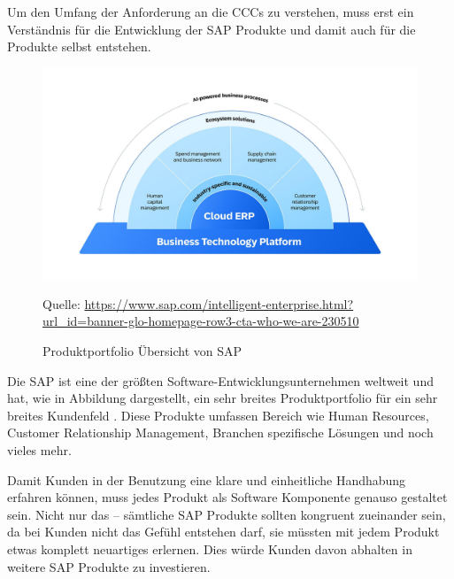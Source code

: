 \documentclass[../main.tex]{subfiles}
\begin{document}
Um den Umfang der Anforderung an die \glspl{CCC} zu verstehen, muss erst ein Verständnis für die Entwicklung der SAP Produkte und damit auch für die Produkte selbst entstehen.

\begin{figure}[ht]
    \centering
    \includegraphics[scale=.21]{"bilder/produktportfolio.jpg"}
    \caption{Produktportfolio Übersicht von SAP}
    \footnotesize Quelle: \url{https://www.sap.com/intelligent-enterprise.html?url_id=banner-glo-homepage-row3-cta-who-we-are-230510}
    \label{fig:produktportfolio}
\end{figure}

Die SAP ist eine der größten Software-Entwicklungsunternehmen weltweit und hat, wie in Abbildung  dargestellt, ein sehr breites Produktportfolio für ein sehr breites Kundenfeld  \cite{CorporateFactSheet}.
Diese Produkte umfassen Bereich wie Human Resources, Customer Relationship Management, Branchen spezifische Lösungen und noch vieles mehr.

Damit Kunden in der Benutzung eine klare und einheitliche Handhabung erfahren können, muss jedes Produkt als Software Komponente genauso gestaltet sein.
Nicht nur das -- sämtliche SAP Produkte sollten kongruent zueinander sein, da bei Kunden nicht das Gefühl entstehen darf, sie müssten mit jedem Produkt etwas komplett neuartiges erlernen.
Dies würde Kunden davon abhalten in weitere SAP Produkte zu investieren.
\cite{SAPUsability}
\end{document}
